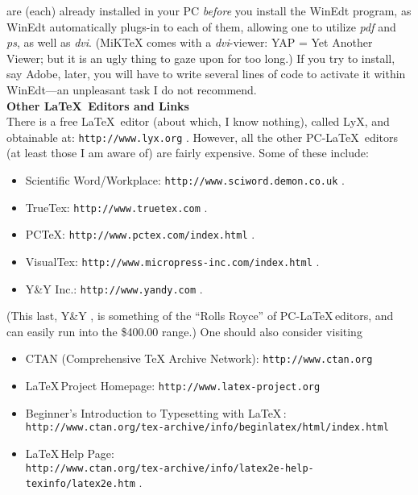 \documentclass[11pt]{gthesis2}  %
\begin{document}
are (each) already installed in your PC \emph{before} you install
the WinEdt program, as WinEdt automatically plugs-in to each of
them, allowing one to utilize \emph{pdf} and \emph{ps}, as well as
\emph{dvi}. (MiKTeX comes with a \emph{dvi}-viewer: YAP = Yet
Another Viewer; but it is an ugly thing to gaze upon for too
long.) If you try to install, say Adobe, later, you will have to
write several lines of code to activate it within WinEdt---an
unpleasant task I do not recommend.
%
\\[.4cm]
\textbf{Other \LaTeX \, Editors and Links}
\\[.4cm]
%
There is a free \LaTeX \, editor (about which, I know nothing),
called LyX, and obtainable at: \texttt{http://www.lyx.org} .
However, all the other PC-\LaTeX \, editors (at least those I am
aware of) are fairly expensive. Some of these include:
%
\begin{itemize}
    \item Scientific Word/Workplace: \texttt{http://www.sciword.demon.co.uk} .
    \item TrueTex:  \texttt{http://www.truetex.com} .
    \item  PCTeX:  \texttt{http://www.pctex.com/index.html} .
    \item VisualTex:  \texttt{http://www.micropress-inc.com/index.html} .
    \item Y\&Y Inc.:  \texttt{http://www.yandy.com} .
\end{itemize}
%
(This last, Y\&Y , is something of the ``Rolls Royce'' of
PC-\LaTeX\,editors, and can easily run into the \$400.00 range.)
One should also consider visiting
%
\begin{itemize}
    \item CTAN (Comprehensive TeX Archive Network):
    \texttt{http://www.ctan.org}
    \item \LaTeX \,Project Homepage: \texttt{http://www.latex-project.org}
    \item Beginner's Introduction to Typesetting with \LaTeX\,:\\
    \texttt{http://www.ctan.org/tex-archive/info/beginlatex/html/index.html}
    \item \LaTeX\,Help Page: \\

\texttt{http://www.ctan.org/tex-archive/info/latex2e-help-texinfo/latex2e.htm}\,\,.
\end{itemize}
%
%
%
\newpage%
%
\end{document}

